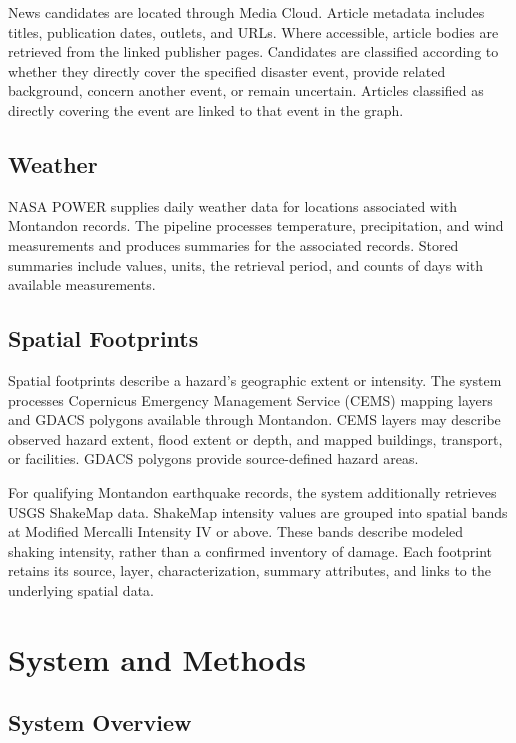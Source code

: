 \documentclass[journal]{IEEEtran}
\begin{document}
News candidates are located through Media Cloud. Article metadata
includes titles, publication dates, outlets, and URLs. Where
accessible, article bodies are retrieved from the linked publisher
pages. Candidates are classified according to whether they directly
cover the specified disaster event, provide related background,
concern another event, or remain uncertain. Articles classified as
directly covering the event are linked to that event in the graph.

\subsection{Weather}

NASA POWER supplies daily weather data for locations associated with
Montandon records. The pipeline processes temperature, precipitation,
and wind measurements and produces summaries for the associated
records. Stored summaries include values, units, the retrieval
period, and counts of days with available measurements.

\subsection{Spatial Footprints}

Spatial footprints describe a hazard's geographic extent or
intensity. The system processes Copernicus Emergency Management
Service (CEMS) mapping layers and GDACS polygons available through
Montandon. CEMS layers may describe observed hazard extent, flood
extent or depth, and mapped buildings, transport, or facilities.
GDACS polygons provide source-defined hazard areas.

For qualifying Montandon earthquake records, the system additionally
retrieves USGS ShakeMap data. ShakeMap intensity values are grouped
into spatial bands at Modified Mercalli Intensity IV or above.
These bands describe modeled shaking intensity, rather than a
confirmed inventory of damage. Each footprint retains its source,
layer, characterization, summary attributes, and links to the
underlying spatial data.

\section{System and Methods}

\subsection{System Overview}
\end{document}
